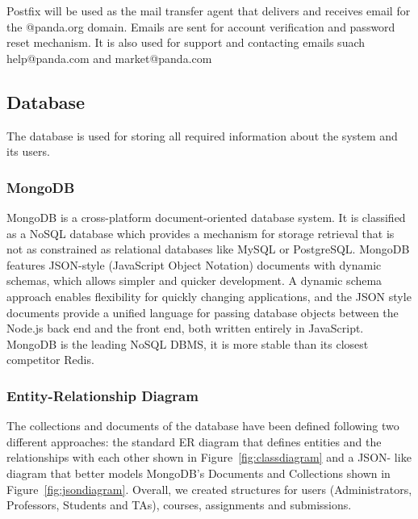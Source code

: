 Postfix\cite{postfix} will be used as the mail transfer agent that delivers and
receives email for the @panda.org domain. Emails are sent for account
verification and password reset mechanism. It is also used for support and
contacting emails suach help@panda.com and market@panda.com


\subsection{Database}

The database is used for storing all required information about the system and
its users.

\subsubsection{MongoDB}

MongoDB\cite{mongodb} is a cross-platform document-oriented database system. It
is classified as a NoSQL database which provides a mechanism for storage
retrieval that is not as constrained as relational databases like MySQL or
PostgreSQL. MongoDB features JSON-style (JavaScript Object Notation) documents
with dynamic schemas, which allows simpler and quicker development. A dynamic
schema approach enables flexibility for quickly changing applications, and the
JSON style documents provide a unified language for passing database objects
between the Node.js back end and the front end, both written entirely in
JavaScript. MongoDB is the leading NoSQL DBMS, it is more stable than its
closest competitor Redis.

\subsubsection{Entity-Relationship Diagram}

The collections and documents of the database have been defined following two
different approaches: the standard ER diagram that defines entities and the
relationships with each other shown in Figure~\ref{fig:classdiagram} and a JSON-
like diagram that better models MongoDB's Documents and Collections shown in
Figure~\ref{fig:jsondiagram}. Overall, we created structures for users
(Administrators, Professors, Students and TAs), courses, assignments and
submissions.

